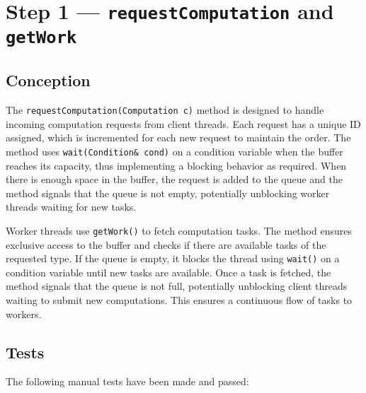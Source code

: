 \documentclass{article}
\begin{document}
    \section*{Step 1 --- \texttt{requestComputation} and \texttt{getWork}}
    \subsection*{Conception}


    The \texttt{requestComputation(Computation c)} method is designed to handle incoming computation requests from client threads.
    Each request has a unique ID assigned, which is incremented for each new request to maintain the order.
    The method uses \texttt{wait(Condition\& cond)} on a condition variable when the buffer reaches its capacity, thus implementing a blocking behavior as required.
    When there is enough space in the buffer, the request is added to the queue and the method signals that the queue is not empty, potentially unblocking worker threads waiting for new tasks.

    Worker threads use \texttt{getWork()} to fetch computation tasks.
    The method ensures exclusive access to the buffer and checks if there are available tasks of the requested type.
    If the queue is empty, it blocks the thread using \texttt{wait()} on a condition variable until new tasks are available.
    Once a task is fetched, the method signals that the queue is not full, potentially unblocking client threads waiting to submit new computations.
    This ensures a continuous flow of tasks to workers.

    \subsection*{Tests}

    The following manual tests have been made and passed:
\end{document}
